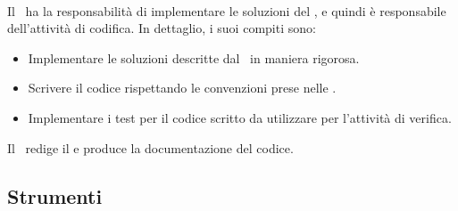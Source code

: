 \paragraph{\Progr}
Il \Progr\ ha la responsabilità di implementare le soluzioni del \Prog, e quindi è
responsabile dell'attività di codifica. In dettaglio, i suoi compiti sono:
\begin{itemize}
  \item Implementare le soluzioni descritte dal \Prog\ in maniera rigorosa.
  \item Scrivere il codice rispettando le convenzioni prese nelle \NdP.
  \item Implementare i test per il codice scritto da utilizzare per l'attività di verifica.
\end{itemize}
Il \Progr\ redige il \MU e produce la documentazione del codice.

\subsection{Strumenti}
